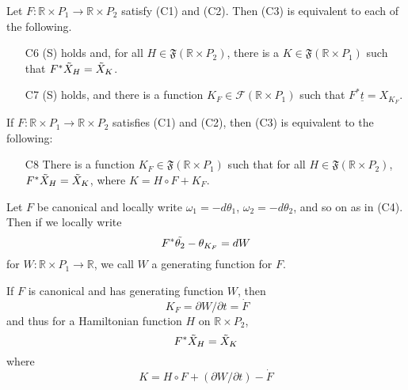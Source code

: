 \begin{prop}

    Let $F: \mathbb{R} \times P_1 \to \mathbb{R} \times P_2$ satisfy (C1) and (C2). Then (C3) is equivalent to each of the following.\\
    \begin{enumerate}

    \item[C6] (S) holds and, for all $H \in \mathfrak{F}(\mathbb{R} \times P_2)$, there is a $K \in \mathfrak{F}( \mathbb{R} \times P_1)$ such that $F^*\Tilde{X}_H = \Tilde{X}_K$.\\
    \item[C7] (S) holds, and there is a function $K_F \in \mathcal{F}(\mathbb{R} \times P_1)$ such that $F^*\underline{t}=X_{K_F}$.

    \end{enumerate}
\end{prop}

\begin{thm}[Jacobi]
    If $F: \mathbb{R} \times P_1 \to \mathbb{R} \times P_2$ satisfies (C1) and (C2), then (C3) is equivalent to the following:

    \begin{enumerate}
        \item[C8] There is a function $K_F \in \mathfrak{F}(\mathbb{R} \times P_1)$ such that for all $H \in \mathfrak{F}(\mathbb{R} \times P_2)$, $F^*\Tilde{X}_H = \Tilde{X}_K$, where $K = H \circ F + K_F$.
    \end{enumerate} 

\end{thm}

\begin{defn}

    Let $F$ be canonical and locally write $\omega_1 = - d\theta_1$, $\omega_2 = -d\theta_2$, and so on as in (C4). Then if we locally write 
    \[F^*\Tilde{\theta_2} - \theta_{K_F} = dW\]
    for $W: \mathbb{R} \times P_1 \to \mathbb{R}$, we call $W$ a generating function for $F$.

\end{defn}


\begin{prop}
    If $F$ is canonical and has generating function $W$, then\[\ K_F = \partial W / \partial t = \dot{F} \]
    and thus for a Hamiltonian function $H$ on $\mathbb{R} \times P_2$,
    \[ F^*\Tilde{X}_H = \Tilde{X}_K \]
    where
    \[ K = H \circ F + (\partial W / \partial t) - \dot{F} \]
\end{prop}

